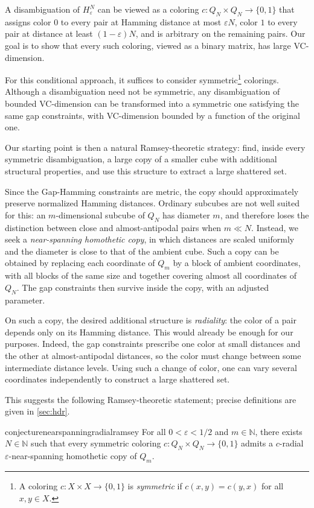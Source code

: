 \documentclass[11pt]{article}
\theoremstyle{remark}
\begin{document}
A disambiguation of $H_\varepsilon^N$ can be viewed as a coloring $c:Q_N\times Q_N\to\{0,1\}$ that assigns color $0$ to every pair at Hamming distance at most $\varepsilon N$, color $1$ to every pair at distance at least $(1-\varepsilon)N$, and is arbitrary on the remaining pairs.
Our goal is to show that every such coloring, viewed as a binary matrix, has large VC-dimension.

For this conditional approach, it suffices to consider symmetric\footnote{A coloring $c : X \times X \to \{0,1\}$ is \emph{symmetric} if $c(x,y)=c(y,x)$ for all $x,y\in X$.} colorings.
Although a disambiguation need not be symmetric, any disambiguation of bounded VC-dimension can be transformed into a symmetric one satisfying the same gap constraints, with VC-dimension bounded by a function of the original one. 

Our starting point is then a natural Ramsey-theoretic strategy: find, inside every symmetric disambiguation, a large copy of a smaller cube with additional structural properties, and use this structure to extract a large shattered set.

Since the Gap-Hamming constraints are metric, the copy should approximately preserve normalized Hamming distances.
Ordinary subcubes are not well suited for this: an $m$-dimensional subcube of $Q_N$ has diameter $m$, and therefore loses the distinction between close and almost-antipodal pairs when $m\ll N$.
Instead, we seek a \emph{near-spanning homothetic copy}, in which distances are scaled uniformly and the diameter is close to that of the ambient cube.
Such a copy can be obtained by replacing each coordinate of $Q_m$ by a block of ambient coordinates, with all blocks of the same size and together covering almost all coordinates of $Q_N$.
The gap constraints then survive inside the copy, with an adjusted parameter.

On such a copy, the desired additional structure is \emph{radiality}: the color of a pair depends only on its Hamming distance.
This would already be enough for our purposes.
Indeed, the gap constraints prescribe one color at small distances and the other at almost-antipodal distances, so the color must change between some intermediate distance levels.
Using such a change of color, one can vary several coordinates independently to construct a large shattered set.

This suggests the following Ramsey-theoretic statement; precise definitions are given in \cref{sec:hdr}.

\begin{restatable}{conjecture}{nearspanningradialramsey}\label{conj:radial}
For all $0 < \varepsilon < 1/2$ and $m \in \mathbb{N}$, there exists $N \in \mathbb{N}$ such that every symmetric coloring $c : Q_N \times Q_N \to \{0,1\}$ admits a $c$-radial $\varepsilon$-near-spanning homothetic copy of $Q_m$.
\end{restatable}
\end{document}
